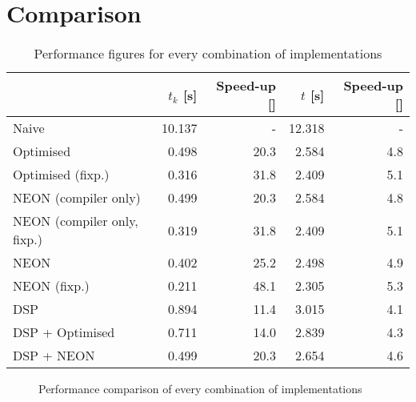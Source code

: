 \documentclass[final]{article}
\begin{document}
\section{Comparison}
\label{sec:comparison}

\begin{table}[H]
	\centering
	\caption{Performance figures for every combination of implementations}
	\begin{tabular}{lrrrr}
		\toprule
									& \textbf{$t_k$ [\si{\second}]}	& \textbf{Speed-up [\si{\speedup}]}	& \textbf{$t$ [\si{\second}]}	& \textbf{Speed-up [\si{\speedup}]} \\
		\midrule
		Naive						& 10.137						& -			 						& 12.318						& -									\\
		Optimised					&  0.498						& 20.3		 						&  2.584						& 4.8								\\
		Optimised (fixp.)			&  0.316						& 31.8		 						&  2.409						& 5.1								\\
		NEON (compiler only)		&  0.499						& 20.3		 						&  2.584						& 4.8								\\
		NEON (compiler only, fixp.)	&  0.319						& 31.8		 						&  2.409						& 5.1								\\
		NEON						&  0.402						& 25.2		 						&  2.498						& 4.9								\\
		NEON (fixp.)				&  0.211						& 48.1		 						&  2.305						& 5.3								\\
		DSP							&  0.894						& 11.4		 						&  3.015						& 4.1								\\
		DSP + Optimised				&  0.711						& 14.0		 						&  2.839						& 4.3								\\
		DSP + NEON					&  0.499						& 20.3		 						&  2.654						& 4.6								\\
		\bottomrule
	\end{tabular}
	\label{tab:comparison}
\end{table}

\setlength\figureheight{6cm}
\setlength\figurewidth{9cm}
\begin{figure}[H]
	\centering
	
	\caption{Performance comparison of every combination of implementations}
	\label{fig:comparison}
\end{figure}
\end{document}
